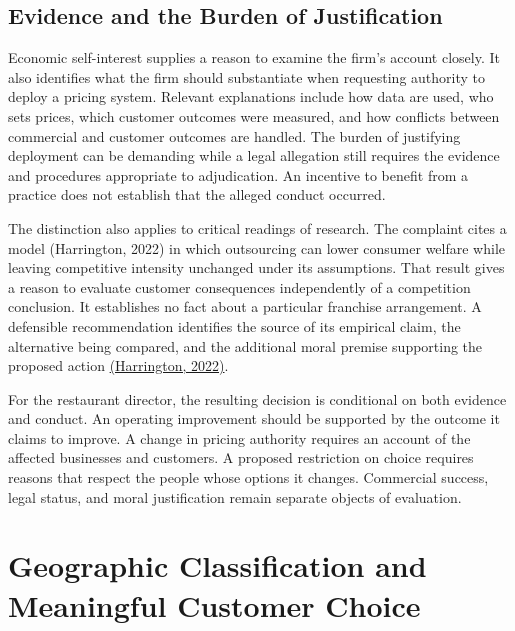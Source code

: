 \hypertarget{M09-evidence-and-the-burden-of-justification}{%
\subsection{Evidence and the Burden of
Justification}\label{M09-evidence-and-the-burden-of-justification}}

\noindent \noindent Economic self-interest supplies a reason to examine the firm's
account closely. It also identifies what the firm should substantiate
when requesting authority to deploy a pricing system. Relevant
explanations include how data are used, who sets prices, which customer
outcomes were measured, and how conflicts between commercial and
customer outcomes are handled. The burden of justifying deployment can
be demanding while a legal allegation still requires the evidence and
procedures appropriate to adjudication. An incentive to benefit from a
practice does not establish that the alleged conduct occurred.

The distinction also applies to critical readings of research. The
complaint cites a model (Harrington, 2022) in which outsourcing can
lower consumer welfare while leaving competitive intensity unchanged
under its assumptions. That result gives a reason to evaluate customer
consequences independently of a competition conclusion. It establishes
no fact about a particular franchise arrangement. A defensible
recommendation identifies the source of its empirical claim, the
alternative being compared, and the additional moral premise supporting
the proposed action
\href{https://doi.org/10.1287/mnsc.2021.4241}{(Harrington, 2022)}.

For the restaurant director, the resulting decision is conditional on
both evidence and conduct. An operating improvement should be supported
by the outcome it claims to improve. A change in pricing authority
requires an account of the affected businesses and customers. A proposed
restriction on choice requires reasons that respect the people whose
options it changes. Commercial success, legal status, and moral
justification remain separate objects of evaluation.


\hypertarget{M09-geographic-classification-and-meaningful-customer-choice}{%
\section{Geographic Classification and Meaningful Customer
Choice}\label{M09-geographic-classification-and-meaningful-customer-choice}}

